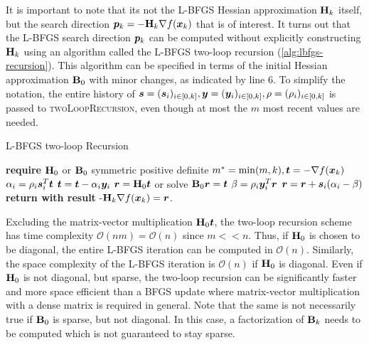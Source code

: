 It is important to note that its not the L-BFGS Hessian approximation $\mathbf{H}_k$ itself, but the search direction $\bm{p}_k = -\mathbf{H}_k 
\nabla f(\bm{x}_k)$ that is of interest. It turns out that the L-BFGS search direction $\bm{p}_k$ can be computed without explicitly 
constructing $\mathbf{H}_k$ using an algorithm called the L-BFGS two-loop recursion (\cref{alg:lbfgs-recursion}). This
algorithm can be specified in terms of the initial Hessian approximation $\mathbf{B}_0$ with minor changes, as indicated by line 6. To 
simplify the notation, the entire history of $\bm{s} = (\bm{s}_i)_{i \in [0, k]}, \bm{y} = (\bm{y}_i)_{i \in [0, k]}, \rho = 
(\rho_i)_{i \in [0, k]}$
is passed to \textsc{twoLoopRecursion}, even though at most the $m$ most recent values are needed.

\begin{algorithm}
\caption{L-BFGS two-loop Recursion}\label{alg:lbfgs-recursion}
\begin{algorithmic}[1]
\State \textbf{require } $\mathbf{H}_0$ or $\mathbf{B}_0$ symmetric positive definite
\State $m^* = \min(m, k), \bm{t} = -\nabla f(\bm{x}_k)$
\State $\alpha_i = \rho_i \bm{s}^T_i \bm{t}$
\State $\bm{t} = \bm{t} - \alpha_i \bm{y}_i$
\EndFor
\State $\bm{r} = \mathbf{H}_0 \bm{t}$ or solve $\mathbf{B}_0 \bm{r} = \bm{t}$
\State $\beta = \rho_i \bm{y}^T_i \bm{r}$
\State $\bm{r} = \bm{r} + \bm{s}_i(\alpha_i - \beta)$
\EndFor
\State \textbf{return with result } -$\mathbf{H}_k \nabla f(\bm{x}_k) = \bm{r}$.
\EndProcedure
\end{algorithmic}
\end{algorithm}

Excluding the matrix-vector multiplication $\mathbf{H}_0 \bm{t}$, the two-loop recursion scheme has time complexity $\mathcal{O}(nm)
= \mathcal{O}(n)$ since $m << n$. Thus,
if $\mathbf{H}_0$ is chosen to be diagonal, the entire L-BFGS iteration can be computed in $\mathcal{O}(n)$. Similarly, the space complexity
of the L-BFGS iteration is $\mathcal{O}(n)$ if $\mathbf{H}_0$ is diagonal. Even if $\mathbf{H}_0$ is not diagonal, but sparse, the two-loop
recursion can be significantly faster and more space efficient than a BFGS update where matrix-vector multiplication with a dense matrix
is required in general. Note that the same is not necessarily true if $\mathbf{B}_0$ is sparse, but not diagonal. In this case, a factorization
of $\mathbf{B}_k$ needs to be computed which is not guaranteed to stay sparse.

